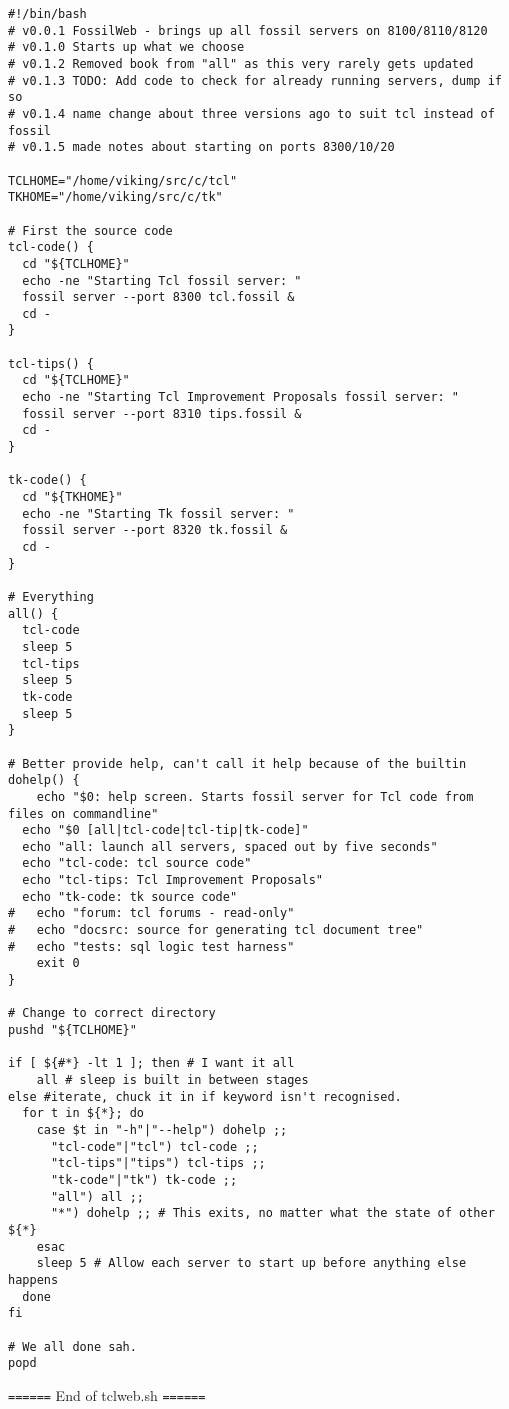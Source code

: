 \documentclass[11pt]{article}
\begin{document}
\begin{verbatim}
#!/bin/bash
# v0.0.1 FossilWeb - brings up all fossil servers on 8100/8110/8120
# v0.1.0 Starts up what we choose
# v0.1.2 Removed book from "all" as this very rarely gets updated
# v0.1.3 TODO: Add code to check for already running servers, dump if so
# v0.1.4 name change about three versions ago to suit tcl instead of fossil
# v0.1.5 made notes about starting on ports 8300/10/20

TCLHOME="/home/viking/src/c/tcl"
TKHOME="/home/viking/src/c/tk"

# First the source code
tcl-code() {
  cd "${TCLHOME}"
  echo -ne "Starting Tcl fossil server: "
  fossil server --port 8300 tcl.fossil &
  cd -
}

tcl-tips() {
  cd "${TCLHOME}"
  echo -ne "Starting Tcl Improvement Proposals fossil server: "
  fossil server --port 8310 tips.fossil &
  cd -
}

tk-code() {
  cd "${TKHOME}"
  echo -ne "Starting Tk fossil server: "
  fossil server --port 8320 tk.fossil &
  cd -
}

# Everything
all() {
  tcl-code
  sleep 5
  tcl-tips
  sleep 5
  tk-code
  sleep 5
}

# Better provide help, can't call it help because of the builtin
dohelp() {
	echo "$0: help screen. Starts fossil server for Tcl code from files on commandline"
  echo "$0 [all|tcl-code|tcl-tip|tk-code]"
  echo "all: launch all servers, spaced out by five seconds"
  echo "tcl-code: tcl source code"
  echo "tcl-tips: Tcl Improvement Proposals"
  echo "tk-code: tk source code"
#	echo "forum: tcl forums - read-only"
#	echo "docsrc: source for generating tcl document tree"
#	echo "tests: sql logic test harness"
	exit 0
}

# Change to correct directory
pushd "${TCLHOME}"

if [ ${#*} -lt 1 ]; then # I want it all
	all # sleep is built in between stages
else #iterate, chuck it in if keyword isn't recognised.
  for t in ${*}; do
    case $t in "-h"|"--help") dohelp ;;
      "tcl-code"|"tcl") tcl-code ;;
      "tcl-tips"|"tips") tcl-tips ;;
      "tk-code"|"tk") tk-code ;;
      "all") all ;;
      "*") dohelp ;; # This exits, no matter what the state of other ${*}
    esac
    sleep 5 # Allow each server to start up before anything else happens
  done
fi

# We all done sah.
popd

\end{verbatim}

\texttt{======} End of tclweb.sh \texttt{======}
\end{document}
